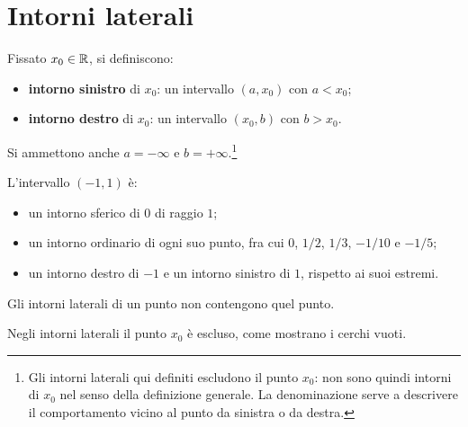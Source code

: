 \section{Intorni laterali}

Fissato $x_0\in\mathbb{R}$, si definiscono:
\begin{itemize}
  \item \textbf{intorno sinistro} di $x_0$: un intervallo $(a,x_0)$ con $a<x_0$;
  \item \textbf{intorno destro} di $x_0$: un intervallo $(x_0,b)$ con $b>x_0$.
\end{itemize}
Si ammettono anche $a=-\infty$ e $b=+\infty$.\footnote{Gli intorni laterali qui definiti escludono il punto $x_0$: non sono quindi intorni di $x_0$ nel senso della definizione generale. La denominazione serve a descrivere il comportamento vicino al punto da sinistra o da destra.}

\begin{esempio}
L'intervallo $(-1,1)$ è:
\begin{itemize}
  \item un intorno sferico di $0$ di raggio $1$;
  \item un intorno ordinario di ogni suo punto, fra cui $0$, $1/2$, $1/3$, $-1/10$ e $-1/5$;
  \item un intorno destro di $-1$ e un intorno sinistro di $1$, rispetto ai suoi estremi.
\end{itemize}
Gli intorni laterali di un punto non contengono quel punto.
\end{esempio}

\begin{schema}
\par\smallskip Negli intorni laterali il punto $x_0$ è escluso, come mostrano i cerchi vuoti.
\end{schema}




